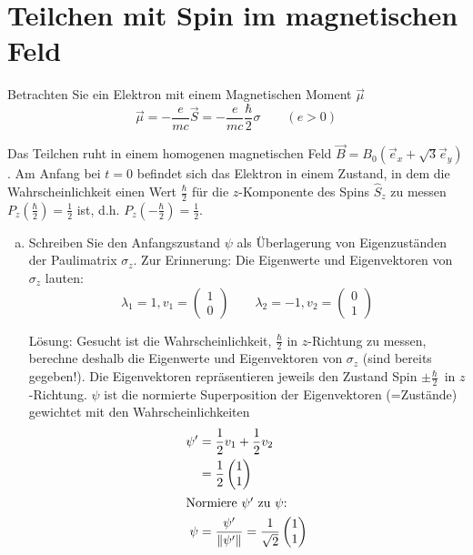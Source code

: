 \documentclass{scrartcl}
\newcommand{\vecz}[2]{\begin{pmatrix}#1 \\ #2\end{pmatrix}}
\begin{document}
\section{Teilchen mit Spin im magnetischen Feld}

Betrachten Sie ein Elektron mit einem Magnetischen Moment $\vec \mu$
\[\vec \mu = -\frac{e}{mc}\vec S=-\frac{e}{mc}\frac{\hbar }{2}\sigma \qquad(e>0)\]

Das Teilchen ruht in einem homogenen magnetischen Feld $\vec B=B_0 (\vec e_x + \sqrt 3 \vec e_y)$. Am Anfang bei $t=0$ befindet sich das Elektron in einem Zustand, in dem die Wahrscheinlichkeit einen Wert $\frac \hbar 2$ für die $z$-Komponente des Spins $\hat S_z$ zu messen $P_z\left(\frac \hbar 2\right)=\frac 12$ ist, d.h. $P_z\left(-\frac \hbar 2\right)=\frac 12$.
\begin{enumerate}[a)]
\item Schreiben Sie den Anfangszustand $\psi$ als Überlagerung von Eigenzuständen der Paulimatrix $\sigma_z$. Zur Erinnerung: Die Eigenwerte und Eigenvektoren von $\sigma_z$ lauten:
\[\lambda_1 = 1, v_1 = \vecz 10 \qquad \lambda_2 = -1, v_2 = \vecz 01\]

\item[Lösung:]
Gesucht ist die Wahrscheinlichkeit, $\frac \hbar 2 $ in $z$-Richtung zu messen, berechne deshalb die Eigenwerte und Eigenvektoren von $\sigma_z$ (sind bereits gegeben!). Die Eigenvektoren repräsentieren jeweils den Zustand \glqq Spin $\pm\frac{\hbar}{2}$\grqq\ in $z$-Richtung. $\psi$ ist die normierte Superposition der Eigenvektoren (=Zustände) gewichtet mit den Wahrscheinlichkeiten
\begin{align*}
\psi' 	&= \frac 12 v_1 + \frac 12 v_2	\\
		&= \frac 12 \vecz 11 \\
\intertext{Normiere $\psi'$ zu $\psi$:}
\psi  &= \frac {\psi'}{\|\psi'\|} = \frac 1{\sqrt 2} \vecz 11
\end{align*}


\end{enumerate}
\end{document}
